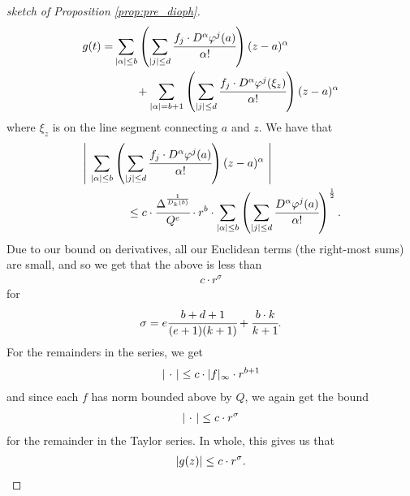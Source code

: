 \begin{proof}[sketch of Proposition \ref{prop:pre_dioph}]
        \begin{align*}
          g(t) = &\sum_{\vert\alpha\vert \leq b} \left( \sum_{\vert j\vert \leq d} \cfrac{f_j \cdot D^{\alpha} \varphi^{j}(a)}{\alpha !} \right) (z - a)^{\alpha} \\
                  &\quad \quad + \sum_{\vert\alpha\vert = b+1} \left( \sum_{\vert j\vert \leq d} \cfrac{f_j \cdot D^{\alpha} \varphi^{j}(\xi_{z}) }{\alpha !} \right) (z - a)^{\alpha}
        \end{align*}
      where $\xi_{z}$ is on the line segment connecting $a$ and $z$. We have that
        \begin{align*}
          &\left\vert \  \sum_{\vert\alpha\vert \leq b} \left( \sum_{\vert j\vert \leq d} \cfrac{f_j \cdot D^{\alpha} \varphi^{j}(a)}{\alpha !} \right) (z - a)^{\alpha}  \ \right\vert \\
          & \quad \quad \quad \quad \leq c 
          \cdot \cfrac{\Delta^{\frac{1}{D_k(b)}}}{Q^e} \cdot r^b \cdot \sum_{\vert\alpha\vert \leq b} \left( \sum_{\vert j\vert \leq d} \cfrac{D^{\alpha} \varphi^{j}(a)}{\alpha !} \right)^{\frac{1}{2}}.
        \end{align*}
      Due to our bound on derivatives, all our Euclidean terms (the right-most sums) are small, and so we get that the above is less than
        \begin{align*}
          c \cdot r^{\sigma}
        \end{align*}
      for
        \begin{align*}
          \sigma = e \cfrac{b + d + 1}{(e + 1)(k + 1)} + \cfrac{b \cdot k}{k + 1}.
        \end{align*}
      For the remainders in the series, we get
        \begin{align*}
          \norm{ \ \cdot \ } \leq c \cdot \norm{f}_{\infty} \cdot r^{b + 1}
        \end{align*}
      and since each $f$ has norm bounded above by $Q$, we again get the bound
        \begin{align*}
          \norm{ \ \cdot \ } \leq c \cdot r^{\sigma}
        \end{align*}
      for the remainder in the Taylor series. In whole, this gives us that 
        \begin{align*}
          \vert g(z)\vert \leq c \cdot r^{\sigma}.
        \end{align*}
      

\end{proof}
